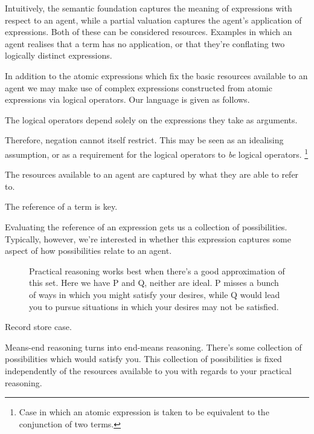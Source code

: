 \documentclass[10pt]{article}
\begin{document}
Intuitively, the semantic foundation captures the meaning of expressions with respect to an agent, while a partial valuation captures the agent's application of expressions.
Both of these can be considered resources.
Examples in which an agent realises that a term has no application, or that they're conflating two logically distinct expressions.




In addition to the atomic expressions which fix the basic resources available to an agent we may make use of complex expressions constructed from atomic expressions via logical operators.
Our language is given as follows.

The logical operators depend solely on the expressions they take as arguments.



Therefore, negation cannot itself restrict.
This may be seen as an idealising assumption, or as a requirement for the logical operators to \emph{be} logical operators.\nolinebreak
\footnote{Case in which an atomic expression is taken to be equivalent to the conjunction of two terms.}

The resources available to an agent are captured by what they are able to refer to.






\newpage

The reference of a term is key.

Evaluating the reference of an expression gets us a collection of possibilities.
Typically, however, we're interested in whether this expression captures some aspect of how possibilities relate to an agent.








\begin{figure}[ht]
  \caption{Practical reasoning works best when there's a good approximation of this set.
    Here we have P and Q, neither are ideal.
    P misses a bunch of ways in which you might satisfy your desires, while Q would lead you to pursue situations in which your desires may not be satisfied.}
\end{figure}

\newpage



Record store case.

Means-end reasoning turns into end-means reasoning.
There's some collection of possibilities which would satisfy you.
This collection of possibilities is fixed independently of the resources available to you with regards to your practical reasoning.
\end{document}
